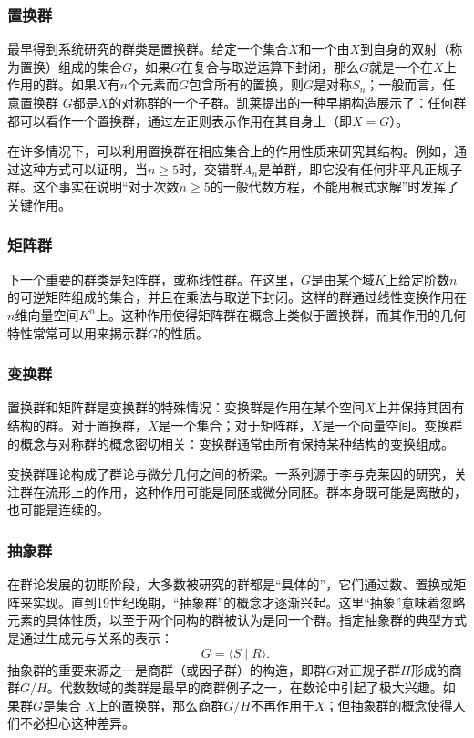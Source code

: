 \subsubsection{置换群}
最早得到系统研究的群类是置换群。给定一个集合$X$和一个由$X$到自身的双射（称为置换）组成的集合$G$，如果$G$在复合与取逆运算下封闭，那么$G$就是一个在$X$上作用的群。如果$X$有$n$个元素而$G$包含所有的置换，则$G$是对称$S_n$；一般而言，任意置换群 $G$都是$X$的对称群的一个子群。凯莱提出的一种早期构造展示了：任何群都可以看作一个置换群，通过左正则表示作用在其自身上（即$X = G$）。

在许多情况下，可以利用置换群在相应集合上的作用性质来研究其结构。例如，通过这种方式可以证明，当$n \geq 5$时，交错群$A_n$是单群，即它没有任何非平凡正规子群。这个事实在说明“对于次数$n \geq 5$的一般代数方程，不能用根式求解”时发挥了关键作用。
\subsubsection{矩阵群}
下一个重要的群类是矩阵群，或称线性群。在这里，$G$是由某个域$K$上给定阶数$n$的可逆矩阵组成的集合，并且在乘法与取逆下封闭。这样的群通过线性变换作用在$n$维向量空间$K^n$上。这种作用使得矩阵群在概念上类似于置换群，而其作用的几何特性常常可以用来揭示群$G$的性质。
\subsubsection{变换群}
置换群和矩阵群是变换群的特殊情况：变换群是作用在某个空间$X$上并保持其固有结构的群。对于置换群，$X$是一个集合；对于矩阵群，$X$是一个向量空间。变换群的概念与对称群的概念密切相关：变换群通常由所有保持某种结构的变换组成。

变换群理论构成了群论与微分几何之间的桥梁。一系列源于李与克莱因的研究，关注群在流形上的作用，这种作用可能是同胚或微分同胚。群本身既可能是离散的，也可能是连续的。
\subsubsection{抽象群}
在群论发展的初期阶段，大多数被研究的群都是“具体的”，它们通过数、置换或矩阵来实现。直到19世纪晚期，“抽象群”的概念才逐渐兴起。这里“抽象”意味着忽略元素的具体性质，以至于两个同构的群被认为是同一个群。指定抽象群的典型方式是通过生成元与关系的表示：
$$
G = \langle S \mid R \rangle .~
$$
抽象群的重要来源之一是商群（或因子群）的构造，即群$G$对正规子群$H$形成的商群$G/H$。代数数域的类群是最早的商群例子之一，在数论中引起了极大兴趣。如果群$G$是集合 $X$上的置换群，那么商群$G/H$不再作用于$X$；但抽象群的概念使得人们不必担心这种差异。

